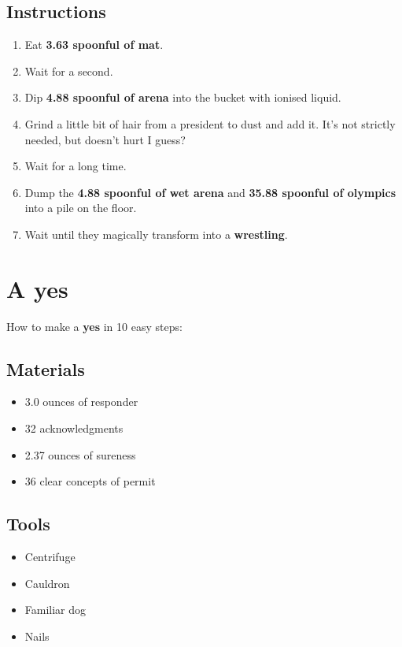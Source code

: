 \documentclass{article}
\begin{document}
\subsection{Instructions}\begin{enumerate}
\item 
Eat \textbf{3.63 spoonful of mat}.
\item 
Wait for a second.
\item 
Dip \textbf{4.88 spoonful of arena} into the bucket with ionised liquid.
\item 
Grind a little bit of hair from a president to dust and add it. It's not strictly needed, but doesn't hurt I guess?
\item 
Wait for a long time.
\item 
Dump the \textbf{4.88 spoonful of wet arena} and \textbf{35.88 spoonful of olympics} into a pile on the floor.
\item 
Wait until they magically transform into a \textbf{wrestling}.
\end{enumerate}
\newpage
\section{A yes}How to make a \textbf{yes} in 10 easy steps:

\subsection{Materials}\begin{itemize}
\item 
3.0 ounces of responder
\item 
32 acknowledgments
\item 
2.37 ounces of sureness
\item 
36 clear concepts of permit
\end{itemize}
\subsection{Tools}\begin{itemize}
\item 
Centrifuge
\item 
Cauldron
\item 
Familiar dog
\item 
Nails
\end{itemize}
\end{document}
